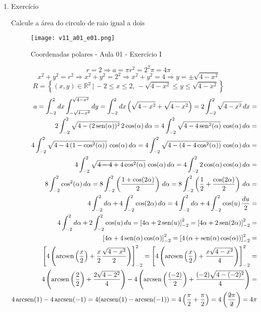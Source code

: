\begin{enumerate}
	\item Exercício
	
	Calcule a área do circulo de raio igual a dois
	
	\begin{figure}[htb]
		\caption{Coordenadas polares - Aula 01 - Exercício I}
		\label{v11_a01_e01}
		\centering
		\texttt{[image: v11\_a01\_e01.png]}		
	\end{figure}
	
	\begin{equation*}
		r = 2 \Rightarrow a = \pi r^2 = 2^2 \pi = 4\pi	
	\end{equation*}
	\begin{equation*}
		x^2 + y^2 = r^2 \Rightarrow x^2 + y^2 = 2^2 \Rightarrow x^2 + y^2 = 4 \Rightarrow y = \pm\sqrt{4 - x^2}
	\end{equation*}	
	\begin{equation*}
		R = \left\{(x, y) \in \mathbb{R}^2 \,|\, -2 \leq x \leq 2,\, -\sqrt{4 - x^2} \leq y \leq \sqrt{4 - x^2} \right\}
	\end{equation*}
	\begin{align*}
		a = \int_{-2}^2 dx \int_{-\sqrt{4 - x^2}}^{\sqrt{4 - x^2}} dy = \int_{-2}^2 dx \left(\sqrt{4 - x^2} + \sqrt{4 - x^2}\right) = 2\int_{-2}^2 \sqrt{4 - x^2}\, dx =\\ 2\int_{-2}^2 \sqrt{4 - (2\sen(\alpha))^2}\, 2\cos(\alpha)\,d\alpha = 4\int_{-2}^2 \sqrt{4 - 4\sen^2(\alpha)}\, \cos(\alpha)\,d\alpha =\\ 4\int_{-2}^2 \sqrt{4 - 4\left(1 - \cos^2(\alpha)\right)}\, \cos(\alpha)\,d\alpha = 4\int_{-2}^2 \sqrt{4 - \left(4 - 4\cos^2(\alpha)\right)}\, \cos(\alpha)\,d\alpha =\\ 4\int_{-2}^2 \sqrt{\overstrike{4 - 4} + 4\cos^2(\alpha)}\, \cos(\alpha)\,d\alpha = 4\int_{-2}^2 2\cos(\alpha)\cos(\alpha)\,d\alpha =\\ 8\int_{-2}^2 \cos^2(\alpha)\,d\alpha = 8\int_{-2}^2 \left(\dfrac{1 + \cos(2\alpha)}{2}\right)\,d\alpha = 8\int_{-2}^2 \left(\dfrac{1}{2} + \dfrac{\cos(2\alpha)}{2}\right)\,d\alpha =\\ 4\int_{-2}^2 d\alpha + 4\int_{-2}^2 \cos(2\alpha)\, d\alpha = 4\int_{-2}^2 d\alpha + 4\int_{-2}^2 \cos(u)\, \dfrac{du}{2} =\\ 4\int_{-2}^2 d\alpha + 2\int_{-2}^2 \cos(u)\, du = \left[4\alpha + 2 \sen(u)\right]_{-2}^2 = \left[4\alpha + 2 \sen(2\alpha)\right]_{-2}^2 =\\ \left[4\alpha + 4 \sen(\alpha)\cos(\alpha)\right]_{-2}^2 = \left[4\left(\alpha + \sen(\alpha)\cos(\alpha)\right)\right]_{-2}^2 =\\ \left[4\left(\arcsen\left(\dfrac{x}{2}\right) + \dfrac{x}{2}\dfrac{\sqrt{4 - x^2}}{2}\right)\right]_{-2}^2 = \left[4\left(\arcsen\left(\dfrac{x}{2}\right) + \dfrac{x\sqrt{4 - x^2}}{4}\right)\right]_{-2}^2 =\\ 4\left(\arcsen\left(\dfrac{2}{2}\right) + \dfrac{2\sqrt{4 - 2^2}}{4}\right) - 4\left(\arcsen\left(\dfrac{(-2)}{2}\right) + \dfrac{(-2)\sqrt{4 - (-2)^2}}{4}\right) =\\ 4\arcsen(1) - 4\arcsen(-1) =  4(\arcsen(1) - \arcsen(-1)) = 4\left(\dfrac{\pi}{2} + \dfrac{\pi}{2}\right) = 4\left(\dfrac{\overstrike{2}\pi}{\overstrike{2}}\right) = 4\pi

\end{align*}
\end{enumerate}
